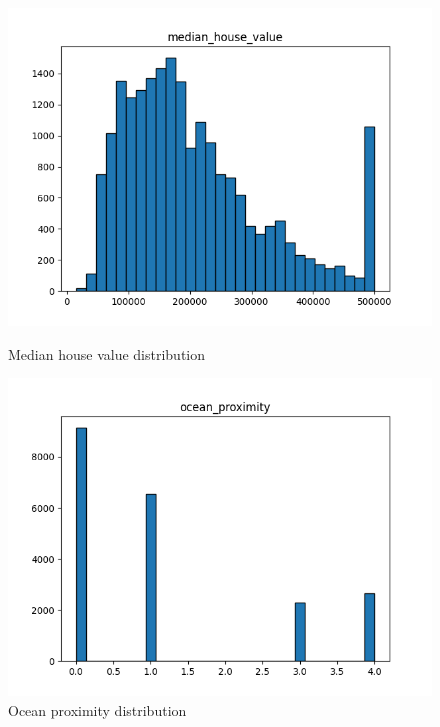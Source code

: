 \documentclass[a4paper, 11pt]{article}
\begin{document}
\begin{figure}[htbp]
    \vspace{0.1cm}  %
    
    \begin{minipage}{0.45\textwidth}
        \centering
        \includegraphics[width=\linewidth]{figs/median_house_value_distribution.png}
        \caption{Median house value distribution}
        \label{fig:median_house_value_distribution}
    \end{minipage}\hfill
    \begin{minipage}{0.45\textwidth}
        \centering
        \includegraphics[width=\linewidth]{figs/ocean_proximity_distribution.png}
        \caption{Ocean proximity distribution}
        \label{fig:ocean_proximity_distribution}
    \end{minipage}
\end{figure}
\end{document}
